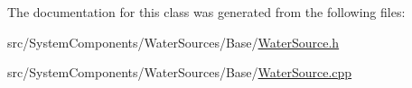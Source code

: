 The documentation for this class was generated from the following files\+:\begin{DoxyCompactItemize}
\item 
src/\+System\+Components/\+Water\+Sources/\+Base/\mbox{\hyperlink{WaterSource_8h}{Water\+Source.\+h}}\item 
src/\+System\+Components/\+Water\+Sources/\+Base/\mbox{\hyperlink{WaterSource_8cpp}{Water\+Source.\+cpp}}\end{DoxyCompactItemize}
